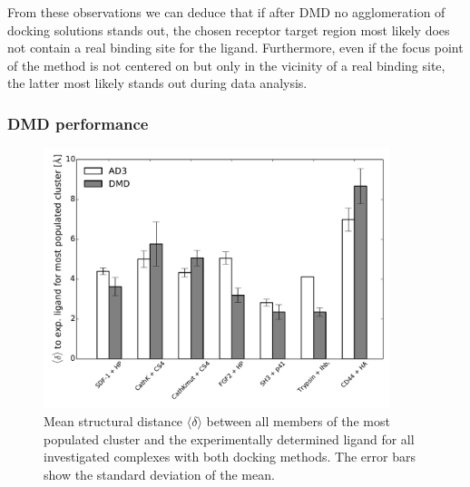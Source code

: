 From these observations we can deduce that if after DMD no agglomeration of
docking solutions stands out, the chosen receptor target region most likely does
not contain a real binding site for the ligand. Furthermore, even if the focus
point of the method is not centered on but only in the vicinity of a real
binding site, the latter most likely stands out during data analysis.

\subsubsection{DMD performance}
\label{dmd:performance}

\begin{figure}
\centering
\includegraphics[width=0.9\textwidth]{gfx/dmd/figure_4_clustering_dmd_vs_ad3_plots_pub_004.pdf}
\caption[]{
Mean structural distance $\langle \delta \rangle$ between all members of the
most populated cluster and the experimentally determined ligand for all
investigated complexes with both docking methods. The error bars show the
standard deviation of the mean.
}
\label{fig:dmd:clus_dmd_vs_ad3}
\end{figure}



